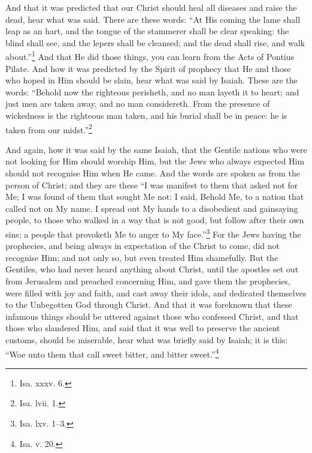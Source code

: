 
And that it was predicted that our Christ  should heal all diseases and raise the dead, hear what was said. There are these words: “At His coming the lame shall leap as an hart, and the tongue of the stammerer shall be clear speaking: the blind shall see, and the lepers shall be cleansed; and the dead shall rise, and walk about.”\footnote{Isa. xxxv. 6.} And that He did those things, you can learn from the Acts of Pontius Pilate. And how it was predicted by the Spirit of prophecy that He and those who hoped in Him should be slain, hear what was said by Isaiah. These are the words: “Behold now the righteous perisheth, and no man layeth it to heart; and just men are taken away, and no man considereth. From the presence of wickedness is the righteous man taken, and his burial shall be in peace: he is taken from our midst.”\footnote{Isa. lvii. 1.}


And again, how it was said by the same Isaiah, that the Gentile nations who were not looking for Him should worship Him, but the Jews who always expected Him should not recognise Him when He came. And the words are spoken as from the person of Christ; and they are these “I was manifest to them that asked not for Me; I was found of them that sought Me not: I said, Behold Me, to a nation that called not on My name. I spread out My hands to a disobedient and gainsaying people, to those who walked in a way that is not good, but follow after their own sins; a people that provoketh Me to anger to My face.”\footnote{Isa. lxv. 1–3.} For the Jews having the prophecies, and being always in expectation of the Christ to come, did not recognise Him; and not only so, but even treated Him shamefully. But the Gentiles, who had never heard anything about Christ, until the apostles set out from Jerusalem and preached concerning Him, and gave them the prophecies, were filled with joy and faith, and cast away their idols, and dedicated themselves to the Unbegotten God through Christ. And that it was foreknown that these infamous things should be uttered against those who confessed Christ, and that those who slandered Him, and said that it was well to preserve the ancient customs, should be miserable, hear what was briefly said by Isaiah; it is this: “Woe unto them that call sweet bitter, and bitter sweet.”\footnote{Isa. v. 20.}


